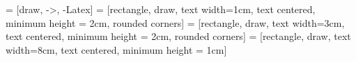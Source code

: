       = [draw, ->, -Latex]
 = [rectangle, draw, text width=1cm, text centered, minimum height = 2cm, rounded corners]
     = [rectangle, draw, text width=3cm, text centered, minimum height = 2cm, rounded corners]
 = [rectangle, draw, text width=8cm, text centered, minimum height = 1cm]